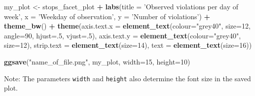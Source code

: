 \documentclass[]{book}
\newenvironment{Shaded}{\begin{snugshade}}{\end{snugshade}}
\newcommand{\KeywordTok}[1]{\textcolor[rgb]{0.13,0.29,0.53}{\textbf{#1}}}
\newcommand{\DataTypeTok}[1]{\textcolor[rgb]{0.13,0.29,0.53}{#1}}
\newcommand{\DecValTok}[1]{\textcolor[rgb]{0.00,0.00,0.81}{#1}}
\newcommand{\StringTok}[1]{\textcolor[rgb]{0.31,0.60,0.02}{#1}}
\newcommand{\OperatorTok}[1]{\textcolor[rgb]{0.81,0.36,0.00}{\textbf{#1}}}
\newcommand{\NormalTok}[1]{#1}
\theoremstyle{definition}
\theoremstyle{definition}
\theoremstyle{definition}
\theoremstyle{remark}
\begin{document}
\begin{Shaded}
\begin{Highlighting}[]
\NormalTok{my_plot <-}\StringTok{ }\NormalTok{stops_facet_plot }\OperatorTok{+}
\StringTok{  }\KeywordTok{labs}\NormalTok{(}\DataTypeTok{title =} \StringTok{'Observed violations per day of week'}\NormalTok{,}
         \DataTypeTok{x =} \StringTok{'Weekday of observation'}\NormalTok{,}
         \DataTypeTok{y =} \StringTok{'Number of violations'}\NormalTok{) }\OperatorTok{+}
\StringTok{  }\KeywordTok{theme_bw}\NormalTok{() }\OperatorTok{+}\StringTok{ }
\StringTok{  }\KeywordTok{theme}\NormalTok{(}\DataTypeTok{axis.text.x =} \KeywordTok{element_text}\NormalTok{(}\DataTypeTok{colour=}\StringTok{"grey40"}\NormalTok{, }\DataTypeTok{size=}\DecValTok{12}\NormalTok{, }\DataTypeTok{angle=}\DecValTok{90}\NormalTok{, }\DataTypeTok{hjust=}\NormalTok{.}\DecValTok{5}\NormalTok{, }\DataTypeTok{vjust=}\NormalTok{.}\DecValTok{5}\NormalTok{),}
        \DataTypeTok{axis.text.y =} \KeywordTok{element_text}\NormalTok{(}\DataTypeTok{colour=}\StringTok{"grey40"}\NormalTok{, }\DataTypeTok{size=}\DecValTok{12}\NormalTok{),}
        \DataTypeTok{strip.text =} \KeywordTok{element_text}\NormalTok{(}\DataTypeTok{size=}\DecValTok{14}\NormalTok{),}
        \DataTypeTok{text =} \KeywordTok{element_text}\NormalTok{(}\DataTypeTok{size=}\DecValTok{16}\NormalTok{))}

\KeywordTok{ggsave}\NormalTok{(}\StringTok{"name_of_file.png"}\NormalTok{, my_plot, }\DataTypeTok{width=}\DecValTok{15}\NormalTok{, }\DataTypeTok{height=}\DecValTok{10}\NormalTok{)}
\end{Highlighting}
\end{Shaded}

Note: The parameters \texttt{width} and \texttt{height} also determine
the font size in the saved plot.


\end{document}
